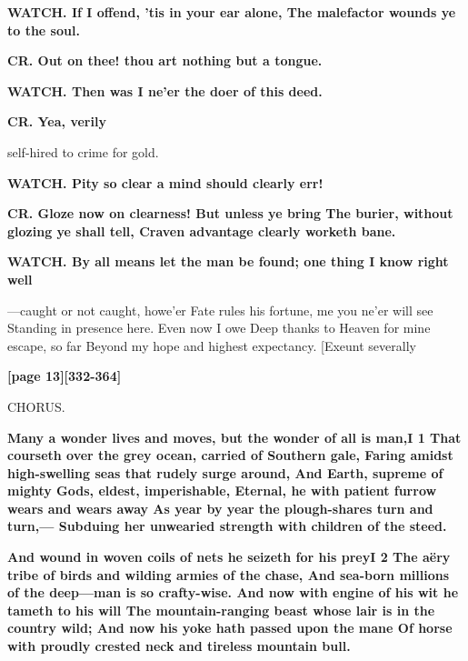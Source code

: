 \documentclass[11pt,letter]{book}
\begin{document}
\par \textbf{WATCH. If I offend, ’tis in your ear alone, The malefactor wounds ye to the soul.}
\par 

\par \textbf{CR. Out on thee! thou art nothing but a tongue.}
\par 

\par \textbf{WATCH. Then was I ne’er the doer of this deed.}
\par 

\par \textbf{CR. Yea, verily}
\par   self-hired to crime for gold.

\par \textbf{WATCH. Pity so clear a mind should clearly err!}
\par 

\par \textbf{CR. Gloze now on clearness! But unless ye bring The burier, without glozing ye shall tell, Craven advantage clearly worketh bane.}
\par 

\par \textbf{WATCH. By all means let the man be found; one thing I know right well}
\par  —caught or not caught, howe’er Fate rules his fortune, me you ne’er will see Standing in presence here. Even now I owe Deep thanks to Heaven for mine escape, so far Beyond my hope and highest expectancy. [Exeunt severally

\par \textbf{[page 13][332-364]}
\par 

\par  CHORUS.

\par \textbf{Many a wonder lives and moves, but the wonder of all is man,I 1 That courseth over the grey ocean, carried of Southern gale, Faring amidst high-swelling seas that rudely surge around, And Earth, supreme of mighty Gods, eldest, imperishable, Eternal, he with patient furrow wears and wears away As year by year the plough-shares turn and turn,— Subduing her unwearied strength with children of the steed.}
\par 

\par \textbf{And wound in woven coils of nets he seizeth for his preyI 2 The aëry tribe of birds and wilding armies of the chase, And sea-born millions of the deep—man is so crafty-wise. And now with engine of his wit he tameth to his will The mountain-ranging beast whose lair is in the country wild; And now his yoke hath passed upon the mane Of horse with proudly crested neck and tireless mountain bull.}
\par 
\end{document}
